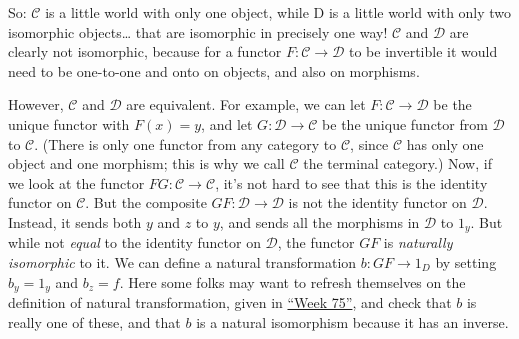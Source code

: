 \documentclass{article}
\begin{document}
So: \(\mathcal{C}\) is a little world with only one object, while D is a
little world with only two isomorphic objects\ldots{} that are
isomorphic in precisely one way! \(\mathcal{C}\) and \(\mathcal{D}\) are
clearly not isomorphic, because for a functor
\(F\colon\mathcal{C}\to\mathcal{D}\) to be invertible it would need to
be one-to-one and onto on objects, and also on morphisms.

However, \(\mathcal{C}\) and \(\mathcal{D}\) are equivalent. For
example, we can let \(F\colon\mathcal{C}\to\mathcal{D}\) be the unique
functor with \(F(x) = y\), and let \(G\colon\mathcal{D}\to\mathcal{C}\)
be the unique functor from \(\mathcal{D}\) to \(\mathcal{C}\). (There is
only one functor from any category to \(\mathcal{C}\), since
\(\mathcal{C}\) has only one object and one morphism; this is why we
call \(\mathcal{C}\) the terminal category.) Now, if we look at the
functor \(FG\colon\mathcal{C}\to\mathcal{C}\), it's not hard to see that
this is the identity functor on \(\mathcal{C}\). But the composite
\(GF\colon\mathcal{D}\to\mathcal{D}\) is not the identity functor on
\(\mathcal{D}\). Instead, it sends both \(y\) and \(z\) to \(y\), and
sends all the morphisms in \(\mathcal{D}\) to \(1_y\). But while not
\emph{equal} to the identity functor on \(\mathcal{D}\), the functor
\(GF\) is \emph{naturally isomorphic} to it. We can define a natural
transformation \(b\colon GF\to 1_D\) by setting \(b_y = 1_y\) and
\(b_z = f\). Here some folks may want to refresh themselves on the
definition of natural transformation, given in
\protect\hyperlink{week75}{``Week 75''}, and check that \(b\) is really
one of these, and that \(b\) is a natural isomorphism because it has an
inverse.
\end{document}
